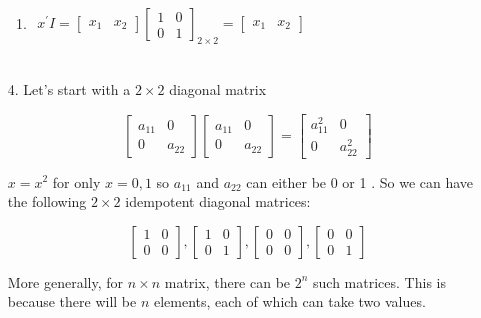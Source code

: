 \documentclass{./../../Latex/handout}
\begin{document}
\begin{enumerate}
\begin{enumerate}
\item $ \begin{aligned} x^{\prime} I=\left[\begin{array}{ll}x_{1} & x_{2}\end{array}\right]\left[\begin{array}{ll}1 & 0 \\ 0 & 1\end{array}\right]_{2 \times 2}=\left[\begin{array}{ll}x_{1} & x_{2}\end{array}\right]\end{aligned}$ \\~\\
\end{enumerate}

\item[4.]Let's start with a $2 \times 2$ diagonal matrix

$$
\left[\begin{array}{cc}
a_{11} & 0 \\
0 & a_{22}
\end{array}\right]\left[\begin{array}{cc}
a_{11} & 0 \\
0 & a_{22}
\end{array}\right]=\left[\begin{array}{cc}
a_{11}^{2} & 0 \\
0 & a_{22}^{2}
\end{array}\right]
$$

$x=x^{2}$ for only $x=0,1$ so $a_{11}$ and $a_{22}$ can either be 0 or 1 . So we can have the following $2 \times 2$ idempotent diagonal matrices:

$$
\left[\begin{array}{ll}
1 & 0 \\
0 & 0
\end{array}\right],\left[\begin{array}{ll}
1 & 0 \\
0 & 1
\end{array}\right],\left[\begin{array}{ll}
0 & 0 \\
0 & 0
\end{array}\right],\left[\begin{array}{ll}
0 & 0 \\
0 & 1
\end{array}\right]
$$

More generally, for $n \times n$ matrix, there can be $2^{n}$ such matrices. This is because there will be $n$ elements, each of which can take two values.
\end{enumerate}
\end{document}
